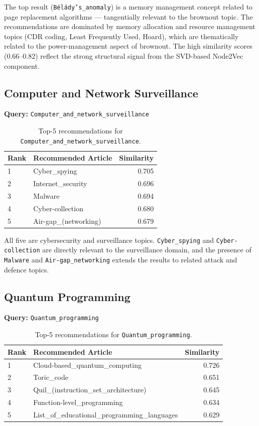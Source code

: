 \documentclass[12pt,a4paper]{article}
\begin{document}
The top result (\texttt{Bélády's\_anomaly}) is a memory management concept
related to page replacement algorithms --- tangentially relevant to the
brownout topic.  The recommendations are dominated by memory allocation and
resource management topics (CDR coding, Least Frequently Used, Hoard), which
are thematically related to the power-management aspect of brownout.  The
high similarity scores (0.66--0.82) reflect the strong structural signal from
the SVD-based Node2Vec component.

\subsection{Computer and Network Surveillance}

\textbf{Query:} \texttt{Computer\_and\_network\_surveillance}

\begin{table}[H]
\centering
\caption{Top-5 recommendations for \texttt{Computer\_and\_network\_surveillance}.}
\label{tab:surveillance}
\begin{tabular}{llr}
\toprule
\textbf{Rank} & \textbf{Recommended Article} & \textbf{Similarity} \\
\midrule
1 & Cyber\_spying & 0.705 \\
2 & Internet\_security & 0.696 \\
3 & Malware & 0.694 \\
4 & Cyber-collection & 0.680 \\
5 & Air-gap\_(networking) & 0.679 \\
\bottomrule
\end{tabular}
\end{table}

All five are cybersecurity and surveillance topics.  \texttt{Cyber\_spying}
and \texttt{Cyber-collection} are directly relevant to the surveillance
domain, and the presence of \texttt{Malware} and \texttt{Air-gap\_networking}
extends the results to related attack and defence topics.

\subsection{Quantum Programming}

\textbf{Query:} \texttt{Quantum\_programming}

\begin{table}[H]
\centering
\caption{Top-5 recommendations for \texttt{Quantum\_programming}.}
\label{tab:quantum}
\begin{tabular}{llr}
\toprule
\textbf{Rank} & \textbf{Recommended Article} & \textbf{Similarity} \\
\midrule
1 & Cloud-based\_quantum\_computing & 0.726 \\
2 & Toric\_code & 0.651 \\
3 & Quil\_(instruction\_set\_architecture) & 0.645 \\
4 & Function-level\_programming & 0.634 \\
5 & List\_of\_educational\_programming\_languages & 0.629 \\
\bottomrule
\end{tabular}
\end{table}
\end{document}
